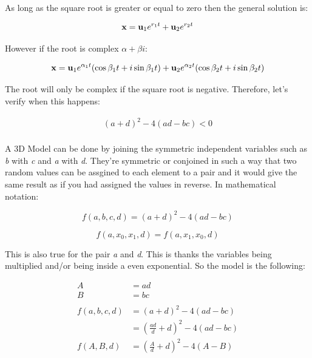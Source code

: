 \documentclass[12pt,letterpaper]{article}
\newcommand{\bmath}[1]{\text{\textbf{#1}}}
\begin{document}
			As long as the square root is greater or equal to zero then the general solution is:

			\begin{equation}
				\bmath{x} =  \bmath{u}_1 e^{r_1 t} + \bmath{u}_2 e^{r_2 t}
			\end{equation}

			However if the root is complex $\alpha + \beta i$:

			\begin{equation}
				\bmath{x} =  \bmath{u}_1 e^{\alpha_1 t} (\cos{\beta_1 t} + i \sin{\beta_1 t}) +\bmath{u}_2 e^{\alpha_2 t} (\cos{\beta_2 t} + i \sin{\beta_2 t})
			\end{equation}

			The root will only be complex if the square root is negative. Therefore, let's verify when this happens:

			\begin{align*}
				(a+d)^2-4(ad-bc) < 0 \\
			\end{align*}

			A 3D Model can be done by joining the symmetric independent variables such as \emph{b} with \emph{c} and \emph{a} with \emph{d}. They're symmetric or conjoined in such a way that two random values can be assgined to each element to a pair and it would give the same result as if you had assigned the values in reverse. In mathematical notation:

			\begin{equation}
				f(a,b,c,d) = (a+d)^2-4(ad-bc)
			\end{equation}

			\begin{equation}
				f(a,x_0,x_1,d) = f(a,x_1,x_0,d)
			\end{equation}

			This is also true for the pair \emph{a} and \emph{d}. This is thanks the variables being multiplied and/or being inside a even exponential. So the model is the following:

			\begin{align*}
				A &= ad \\ 
				B &= bc \\
				\\
				f(a,b,c,d) &= (a+d)^2-4(ad-bc) \\
				&= \left( \frac{ad}{d} + d \right)^2 - 4(ad-bc) \\
				f(A,B,d) &= \left( \frac{A}{d} + d \right)^2 - 4(A-B)
			\end{align*}
\end{document}
